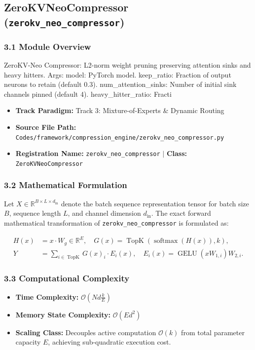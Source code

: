 \subsection{ZeroKVNeoCompressor (\texttt{zerokv\_neo\_compressor})}
\label{sec:app_module_zerokv_neo_compressor}

\subsubsection*{3.1 Module Overview}
ZeroKV-Neo Compressor: L2-norm weight pruning preserving attention sinks and heavy hitters.  Args:     model: PyTorch model.     keep\_ratio: Fraction of output neurons to retain (default 0.3).     num\_attention\_sinks: Number of initial sink channels pinned (default 4).     heavy\_hitter\_ratio: Fracti
\begin{itemize}
    \item \textbf{Track Paradigm:} Track 3: Mixture-of-Experts & Dynamic Routing
    \item \textbf{Source File Path:} \texttt{Codes/framework/compression\_engine/zerokv\_neo\_compressor.py}
    \item \textbf{Registration Name:} \texttt{zerokv\_neo\_compressor} $\mid$ \textbf{Class:} \texttt{ZeroKVNeoCompressor}
\end{itemize}

\subsubsection*{3.2 Mathematical Formulation}
Let $X \in \mathbb{R}^{B \times L \times d_{\text{in}}}$ denote the batch sequence representation tensor for batch size $B$, sequence length $L$, and channel dimension $d_{\text{in}}$. The exact forward mathematical transformation of \texttt{zerokv\_neo\_compressor} is formulated as:

\begin{align}
H(x) &= x \cdot W_g \in \mathbb{R}^{E}, \quad G(x) = \operatorname{TopK}\left(\operatorname{softmax}(H(x)), k\right), \\
Y &= \sum_{i \in \operatorname{TopK}} G(x)_i \cdot E_i(x), \quad E_i(x) = \operatorname{GELU}(x W_{1, i}) W_{2, i}.
\end{align}


\subsubsection*{3.3 Computational Complexity}
\begin{itemize}
    \item \textbf{Time Complexity:} $\mathcal{O}(N d \frac{k}{E})$
    \item \textbf{Memory State Complexity:} $\mathcal{O}(E d^2)$
    \item \textbf{Scaling Class:} Decouples active computation $\mathcal{O}(k)$ from total parameter capacity $E$, achieving sub-quadratic execution cost.
\end{itemize}

